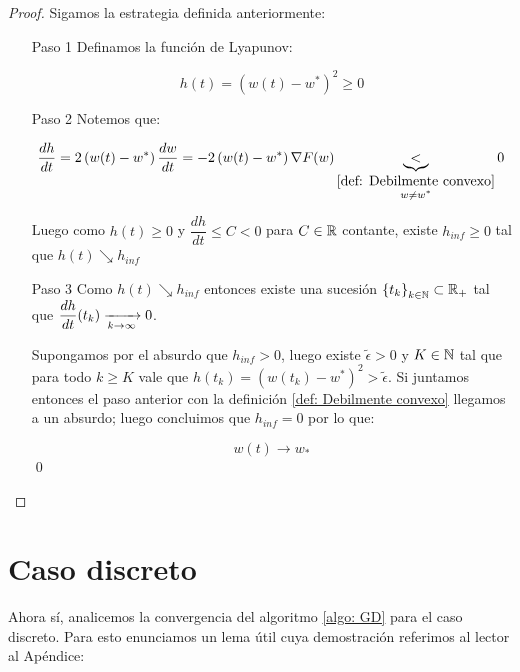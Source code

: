 \begin{proof} Sigamos la estrategia definida anteriormente:
	
	
	\begin{enumerate}
		
		
		\item[Paso 1] Definamos la funci\'on de Lyapunov:
		
		\begin{equation*}
			h(t) = \left(w(t) - w^*\right)^2 \geq 0
		\end{equation*}
		
		\item[Paso 2] Notemos que:
		
		\begin{equation}
		\label{eq: Intuicion batch ctp, ecuacion derivada}
			\dfrac{dh}{dt} = 2 \left(w(t) - w^*\right) \dfrac{dw}{dt} = -2 \left(w(t) - w^*\right) \nabla F(w) \underbrace{<}_{\substack{\ref{def: Debilmente convexo} \\ w \neq w^*}} 0
		\end{equation}
		
		Luego como $h(t) \geq 0$ y $\dfrac{dh}{dt} \leq C < 0$ para $C \in {\mathbb{R}}$ contante, existe $h_{inf} \geq 0$ tal que $h(t) \searrow h_{inf}$
		
		\item[Paso 3] Como $h(t) \searrow h_{inf}$ entonces existe una sucesi\'on $\left\lbrace t_k\right\rbrace_{k \in {\mathbb{N}}} \subset {\mathbb{R}}_+$ tal que $\dfrac{dh}{dt}(t_k) \xrightarrow[k \rightarrow \infty]{} 0$. 
		
		Supongamos por el absurdo que $h_{inf} > 0$, luego existe $\widetilde{\epsilon} >0$ y $K \in {\mathbb{N}}$ tal que para todo $k \geq K$ vale que $h(t_k) = \left(w(t_k) - w^*\right)^2 > \widetilde{\epsilon}$. Si juntamos entonces el paso anterior con la definici\'on \ref{def: Debilmente convexo} llegamos a un absurdo; luego concluimos que $h_{inf} = 0$ por lo que:
		
		\begin{equation*}
			w(t) \rightarrow w_*
		\end{equation*}
		\qed
	\end{enumerate}
\end{proof}

\section{Caso discreto}

Ahora s\'i, analicemos la convergencia del algoritmo \ref{algo: GD} para el caso discreto. Para esto enunciamos un lema \'util cuya demostraci\'on referimos al lector al Ap\'endice:

